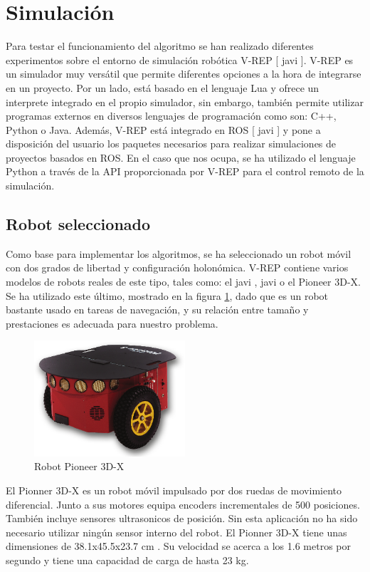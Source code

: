 \section{Simulación}
\label{simulacion}

Para testar el funcionamiento del algoritmo se han realizado diferentes experimentos sobre el entorno de simulación robótica V-REP [ javi ]. V-REP es un simulador muy versátil que permite diferentes opciones a la hora de integrarse en un proyecto. Por un lado, está basado en el lenguaje Lua y ofrece un interprete integrado en el propio simulador, sin embargo, también permite utilizar programas externos en diversos lenguajes de programación como son: C++, Python o Java. Además, V-REP está integrado en ROS [ javi ] y pone a disposición del usuario los paquetes necesarios para realizar simulaciones de proyectos basados en ROS. En el caso que nos ocupa, se ha utilizado el lenguaje Python a través de la API proporcionada por V-REP para el control remoto de la simulación.

\subsection{Robot seleccionado}

Como base para implementar los algoritmos, se ha seleccionado un robot móvil con dos grados de libertad y configuración holonómica. V-REP contiene varios modelos de robots reales de este tipo, tales como: el javi , javi o el Pioneer 3D-X. Se ha utilizado este último, mostrado en la figura \ref{fig:pioneer}, dado que es un robot bastante usado en tareas de navegación, y su relación entre tamaño y prestaciones es adecuada para nuestro problema.

\begin{figure}[h]
		\centering
        \includegraphics[width=0.5\textwidth]{images/pioneer.png}
        \caption{Robot Pioneer 3D-X}
        \label{fig:pioneer}
\end{figure} 

El Pionner 3D-X es un robot móvil impulsado por dos ruedas de movimiento diferencial. Junto a sus motores equipa encoders incrementales de 500 posiciones. También incluye sensores ultrasonicos de posición. Sin esta aplicación no ha sido necesario utilizar ningún sensor interno del robot. El Pionner 3D-X tiene unas dimensiones de 38.1x45.5x23.7 cm . Su velocidad se acerca a los 1.6 metros por segundo y tiene una capacidad de carga de hasta 23 kg.

